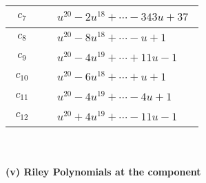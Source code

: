 \documentclass[1p]{elsarticle_modified}
\theoremstyle{definition}
\begin{document}
\begin{tabular}{m{50pt}|m{274pt}}
\hline $$\begin{aligned}c_{7}\end{aligned}$$&$\begin{aligned}
&u^{20}-2 u^{18}+\cdots-343 u+37
\end{aligned}$\\
\hline $$\begin{aligned}c_{8}\end{aligned}$$&$\begin{aligned}
&u^{20}-8 u^{18}+\cdots- u+1
\end{aligned}$\\
\hline $$\begin{aligned}c_{9}\end{aligned}$$&$\begin{aligned}
&u^{20}-4 u^{19}+\cdots+11 u-1
\end{aligned}$\\
\hline $$\begin{aligned}c_{10}\end{aligned}$$&$\begin{aligned}
&u^{20}-6 u^{18}+\cdots+u+1
\end{aligned}$\\
\hline $$\begin{aligned}c_{11}\end{aligned}$$&$\begin{aligned}
&u^{20}-4 u^{19}+\cdots-4 u+1
\end{aligned}$\\
\hline $$\begin{aligned}c_{12}\end{aligned}$$&$\begin{aligned}
&u^{20}+4 u^{19}+\cdots-11 u-1
\end{aligned}$\\
\hline
\end{tabular}\\~\\
\newpage\renewcommand{\arraystretch}{1}
\flushleft \textbf{(v) Riley Polynomials at the component}\newline \\
\end{document}
